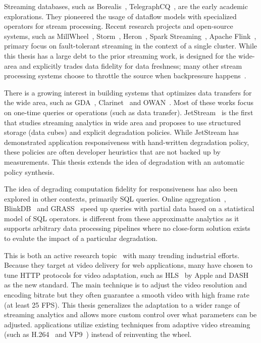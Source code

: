  Streaming databases, such as
Borealis~\cite{abadi2005design},
TelegraphCQ~\cite{chandrasekaran2003telegraphcq}, are the early academic
explorations. They pioneered the usage of dataflow models with specialized
operators for stream processing. Recent research projects and open-source
systems, such as MillWheel~\cite{akidau2013millwheel},
Storm~\cite{toshniwal2014storm}, Heron~\cite{kulkarni2015twitter}, Spark
Streaming~\cite{zaharia2012discretized}, Apache Flink~\cite{carbone2015apache},
primary focus on fault-tolerant streaming in the context of a single
cluster. While this thesis has a large debt to the prior streaming work,
\sysname{} is designed for the wide-area and explicitly trades data fidelity for
data freshness; many other stream processing systems choose to throttle the
source when backpressure happens~\cite{kulkarni2015twitter}.

 There is a growing interest in building systems that optimizes
data transfers for the wide area, such as GDA~\cite{pu2015low},
Clarinet~\cite{viswanathan2016clarinet} and OWAN~\cite{jin2016optimizing}.  Most
of these works focus on one-time queries or operations (such as data
transfer). JetStream~\cite{rabkin2014aggregation} is the first that studies
streaming analytics in wide area and proposes to use structured storage (data
cubes) and explicit degradation policies. While JetStream has demonstrated
application responsiveness with hand-written degradation policy, these policies
are often developer heuristics that are not backed up by measurements. This
thesis extends the idea of degradation with an automatic policy synthesis.

 The idea of degrading computation fidelity for
responsiveness has also been explored in other contexts, primarily SQL
queries. Online aggregation~\cite{hellerstein1997online},
BlinkDB~\cite{agarwal2013blinkdb} and GRASS~\cite{ananthanarayanan2014grass}
speed up queries with partial data based on a statistical model of SQL
operators. \sysname{} is different from these approximatte analytics as it
supports arbitrary data processing pipelines where no close-form solution exists
to evalute the impact of a particular degradation.

 This is both an active research
topic~\cite{sun2016cs2p, yin2015control} with many trending industrial efforts.
Because they target at video delivery for web applications, many have chosen to
tune HTTP protocols for video adaptation, such as HLS~\cite{pantos2016http} by
Apple and DASH~\cite{michalos2012dynamic} as the new standard. The main
technique is to adjust the video resolution and encoding bitrate but they often
guarantee a smooth video with high frame rate (at least 25 FPS). This thesis
generalizes the adaptation to a wider range of streaming analytics and allows
more custom control over what parameters can be adjusted. \sysname{}
applications utilize existing techniques from adaptive video streaming (such as
H.264~\cite{richardson2011h} and VP9~\cite{grange2016vp9}) instead of
reinventing the wheel.

